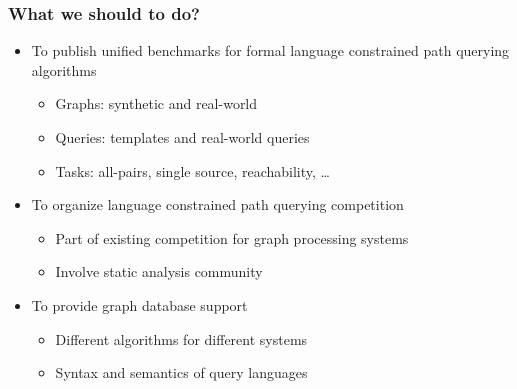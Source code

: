 \documentclass[xcolor=table,aspectratio=169]{beamer}
\begin{document}
\begin{frame}[fragile]
  \frametitle{What we should to do?}
  \begin{itemize}
    \item To publish unified benchmarks for formal language constrained path querying algorithms
    \begin{itemize}
      \item Graphs: synthetic and real-world
      \item Queries: templates and real-world queries
      \item Tasks: all-pairs, single source, reachability, \ldots            
    \end{itemize}
    \pause
    \item To organize language constrained path querying competition
    \begin{itemize}
      \item Part of existing competition for graph processing systems
      \item Involve static analysis community
    \end{itemize}
    \pause
    \item To provide graph database support
    \begin{itemize}
      \item Different algorithms for different systems
      \item Syntax and semantics of query languages 
    \end{itemize}
  \end{itemize}
\end{frame}
\end{document}
